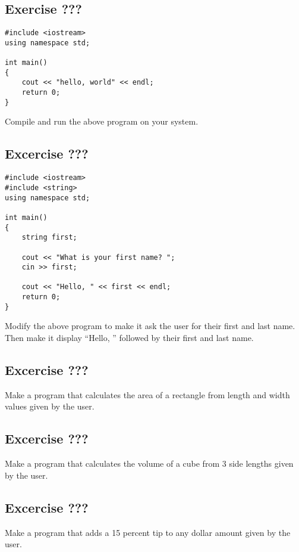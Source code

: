 \documentclass[a4paper,12pt]{article}
\begin{document}
\lstset{tabsize=4,frame=single,basicstyle=\ttfamily}

\subsection*{Exercise ???}
\begin{lstlisting}[caption=hello.cpp]
#include <iostream>
using namespace std;

int main()
{
	cout << "hello, world" << endl;
	return 0;
}
\end{lstlisting}
Compile and run the above program on your system. 

\subsection*{Excercise ???}
\begin{lstlisting}[caption=name.cpp]
#include <iostream>
#include <string>
using namespace std;

int main()
{
	string first;

	cout << "What is your first name? ";
	cin >> first;

	cout << "Hello, " << first << endl;
	return 0;
}	
\end{lstlisting}

Modify the above program to make it ask the user for their first and last name. Then make it display ``Hello, '' followed by their first and last name.

\subsection*{Excercise ???}

Make a program that calculates the area of a rectangle from length and width values given by the user.

\subsection*{Excercise ???}

Make a program that calculates the volume of a cube from 3 side lengths given by the user.

\subsection*{Excercise ???}

Make a program that adds a 15 percent tip to any dollar amount given by the user.
\end{document}
